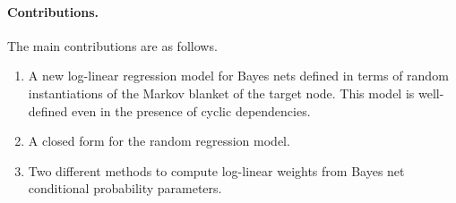 \documentclass[twoside,leqno,twocolumn]{article}
\begin{document}
\paragraph{Contributions.} The main contributions are as follows.
\begin{enumerate}\setlength{\itemsep}{0pt}
\item A new log-linear regression model for Bayes nets defined in terms of random instantiations of the Markov blanket of the target node. This model is well-defined even in the presence of cyclic dependencies.
\item A closed form for the random regression model.
\item Two different methods to compute log-linear weights from Bayes net conditional probability parameters.
\end{enumerate}
\end{document}
